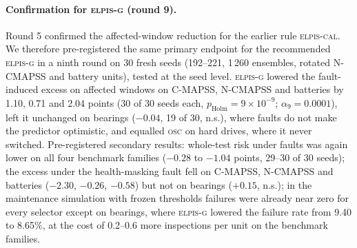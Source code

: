 \documentclass{esannV2}
\newcommand{\OSC}{\textsc{osc}}
\newcommand{\AUTO}{\textsc{elpis-cal}}
\newcommand{\AUTOD}{\textsc{elpis-g}}
\begin{document}
\paragraph{Confirmation for \AUTOD{} (round 9).} Round 5 confirmed the affected-window reduction for the earlier rule \AUTO. We therefore pre-registered the same primary endpoint for the recommended \AUTOD{} in a ninth round on 30 fresh seeds (192--221, 1\,260 ensembles, rotated N-CMAPSS and battery units), tested at the seed level. \AUTOD{} lowered the fault-induced excess on affected windows on C-MAPSS, N-CMAPSS and batteries by 1.10, 0.71 and 2.04 points (30 of 30 seeds each, $p_{\text{Holm}}=9\times10^{-9}$; $\alpha_9=0.0001$), left it unchanged on bearings ($-0.04$, 19 of 30, n.s.), where faults do not make the predictor optimistic, and equalled \OSC{} on hard drives, where it never switched. Pre-registered secondary results: whole-test risk under faults was again lower on all four benchmark families ($-0.28$ to $-1.04$ points, 29--30 of 30 seeds); the excess under the health-masking fault fell on C-MAPSS, N-CMAPSS and batteries ($-2.30$, $-0.26$, $-0.58$) but not on bearings ($+0.15$, n.s.); in the maintenance simulation with frozen thresholds failures were already near zero for every selector except on bearings, where \AUTOD{} lowered the failure rate from 9.40 to 8.65\%, at the cost of 0.2--0.6 more inspections per unit on the benchmark families.
\end{document}
